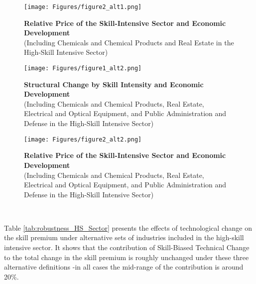 \documentclass[10pt]{article}
\begin{document}
\begin{figure}[!h] 
\caption{\centering \textbf{Relative Price of the Skill-Intensive Sector and Economic Development} \\ (Including Chemicals and Chemical Products and Real Estate in the High-Skill Intensive Sector)}
\centering
\texttt{[image: Figures/figure2\_alt1.png]}
\label{fig:figure2_alt1}
\end{figure}

\begin{figure}[!h] 
\caption{\centering \textbf{Structural Change by Skill Intensity and Economic Development} \\ (Including Chemicals and Chemical Products, Real Estate, Electrical and Optical Equipment, and Public Administration and Defense in the High-Skill Intensive Sector)}
\centering
\texttt{[image: Figures/figure1\_alt2.png]}
\label{fig:figure1_alt2}
\end{figure}

\begin{figure}[!h] 
\caption{\centering \textbf{Relative Price of the Skill-Intensive Sector and Economic Development} \\ (Including Chemicals and Chemical Products, Real Estate, Electrical and Optical Equipment, and Public Administration and Defense in the High-Skill Intensive Sector)}
\centering
\texttt{[image: Figures/figure2\_alt2.png]}
\label{fig:figure2_alt2}
\end{figure}\\
\clearpage 

Table \ref{tab:robustness_HS_Sector} presents the effects of technological change on the skill premium under alternative sets of industries included in the high-skill intensive sector. It shows that the contribution of Skill-Biased Technical Change to the total change in the skill premium is roughly unchanged under these three alternative definitions -in all cases the mid-range of the contribution is around 20\%.\\
\end{document}
